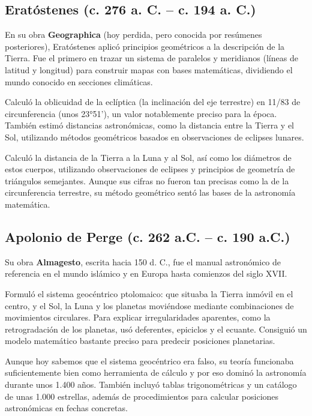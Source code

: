 \documentclass[a4paper,12pt]{article} %
\begin{document}
\subsection{Eratóstenes (c. 276 a. C. – c. 194 a. C.)}
\begin{justify}
	En su obra \textbf{Geographica} (hoy perdida, pero conocida por resúmenes posteriores), 
	Eratóstenes aplicó principios geométricos a la descripción de la Tierra. Fue el primero en trazar un sistema de paralelos y meridianos 
	(líneas de latitud y longitud) para construir mapas con bases matemáticas, dividiendo el mundo conocido en secciones climáticas.
\end{justify} 

\begin{justify}
	Calculó la oblicuidad de la eclíptica 
	(la inclinación del eje terrestre) en 11/83 de circunferencia (unos 23°51'), un valor notablemente preciso para la época. También estimó distancias astronómicas, como 
	la distancia entre la Tierra y el Sol, utilizando métodos geométricos basados en observaciones de eclipses lunares.
\end{justify}

\begin{justify}
	Calculó la distancia de la Tierra a la Luna y al Sol, así como los diámetros de estos cuerpos, utilizando observaciones de eclipses y principios de geometría de triángulos semejantes.
	Aunque sus cifras no fueron tan precisas como la de la circunferencia terrestre, su método geométrico sentó las bases de la astronomía matemática.
\end{justify}

\subsection{Apolonio de Perge (c. 262 a.C. -- c. 190 a.C.)}
\begin{justify}
	Su obra \textbf{Almagesto}, escrita hacia 150
	d. C., fue el manual astronómico de referencia en el mundo islámico y en Europa hasta comienzos
	del siglo XVII.
\end{justify}
\begin{justify}
	Formuló el sistema geocéntrico ptolomaico: que situaba la Tierra inmóvil en el centro, y el Sol, la
	Luna y los planetas moviéndose mediante combinaciones de movimientos circulares.
	Para explicar irregularidades aparentes, como la retrogradación de los planetas, usó deferentes,
	epiciclos y el ecuante. Consiguió un modelo matemático bastante preciso para predecir posiciones
	planetarias.
\begin{justify}
\end{justify}
	Aunque hoy sabemos que el sistema geocéntrico era falso, su teoría funcionaba suficientemente bien
	como herramienta de cálculo y por eso dominó la astronomía durante unos 1.400 años.
	También incluyó tablas trigonométricas y un catálogo de unas 1.000 estrellas, además de
	procedimientos para calcular posiciones astronómicas en fechas concretas.
\end{justify}
\end{document}

